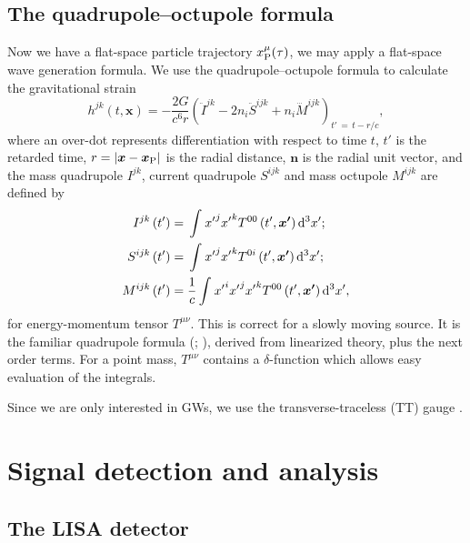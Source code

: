 \subsection{The quadrupole--octupole formula}

Now we have a flat-space particle trajectory $x_\mathrm{P}^\mu(\tau)$, we may apply a flat-space wave generation formula. We use the quadrupole--octupole formula to calculate the gravitational strain \citep{Bekenstein1973, Press1977, Yunes2008}
\begin{equation}
h^{jk}(t, \boldsymbol{x}) = -\frac{2G}{c^6r}\left(\ddot{I}^{jk} - 2n_i\ddot{S}^{ijk} + n_i\dddot{M}^{ijk}\right)_{t'\, =\, t - r/c},
\label{eq:octupole}
\end{equation}
where an over-dot represents differentiation with respect to time $t$, $t'$ is the retarded time, $r = \left|\boldsymbol{x} - \boldsymbol{x}_\mathrm{P}\right|$ is the radial distance, $\boldsymbol{n}$ is the radial unit vector, and the mass quadrupole ${I}^{jk}$, current quadrupole ${S}^{ijk}$ and mass octupole ${M}^{ijk}$ are defined by
\begin{subequations}
\begin{align}
{I}^{jk}\left(t'\right) = {} & \int_{}^{}{{x'}^j{x'}^kT^{00}\left(t', \boldsymbol{x'}\right) }\,\mathrm{d}{^3x'};\\
{S}^{ijk}\left(t'\right) = {} & \int_{}^{}{{x'}^j{x'}^kT^{0i}\left(t', \boldsymbol{x'}\right)}\,\mathrm{d}{^3x'};\\
{M}^{ijk}\left(t'\right)  = {} & \frac{1}{c}\int_{}^{}{{x'}^i{x'}^j{x'}^kT^{00}\left(t', \boldsymbol{x'}\right)}\,\mathrm{d}{^3x'},
\end{align}
\end{subequations}
for energy-momentum tensor $T^{\mu\nu}$. This is correct for a slowly moving source. It is the familiar quadrupole formula \linebreak[0] (\citealt[section 36.10]{Misner1973}; \citealt[section 17.9]{Hobson2006}), derived from linearized theory, plus the next order terms. For a point mass, $T^{\mu\nu}$ contains a $\delta$-function which allows easy evaluation of the integrals.

Since we are only interested in GWs, we use the transverse-traceless (TT) gauge \citep[box 35.1]{Misner1973}.

\section{Signal detection and analysis}\label{sec:Signal}

\subsection{The LISA detector}\label{sec:Detector}

